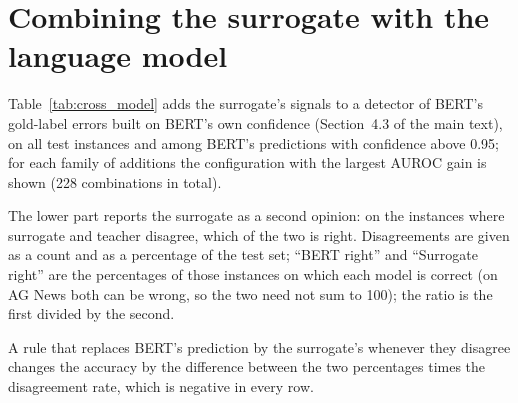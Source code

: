 \documentclass[3p,times,10pt,nopreprintline]{elsarticle}
\begin{document}
\begin{table}[H]
\centering
\scriptsize
\setlength{\tabcolsep}{4pt}
\caption{Gradient-boosting detector (gold-label errors, 10-fold cross-validation) on the same features as the logistic detector: AUROC on the confidence alone and on confidence plus explanation, and paired-bootstrap gains in AUROC and AUPRC with 95\% intervals.}
\label{tab:gbm}
\end{table}

\section{Combining the surrogate with the language model}

Table~\ref{tab:cross_model} adds the surrogate's signals to a detector of BERT's gold-label errors built on BERT's own confidence (Section~4.3 of the main text), on all test instances and among BERT's predictions with confidence above 0.95; for each family of additions the configuration with the largest AUROC gain is shown (228 combinations in total).

The lower part reports the surrogate as a second opinion: on the instances where surrogate and teacher disagree, which of the two is right. Disagreements are given as a count and as a percentage of the test set; ``BERT right'' and ``Surrogate right'' are the percentages of those instances on which each model is correct (on AG News both can be wrong, so the two need not sum to 100); the ratio is the first divided by the second.

A rule that replaces BERT's prediction by the surrogate's whenever they disagree changes the accuracy by the difference between the two percentages times the disagreement rate, which is negative in every row.
\end{document}
